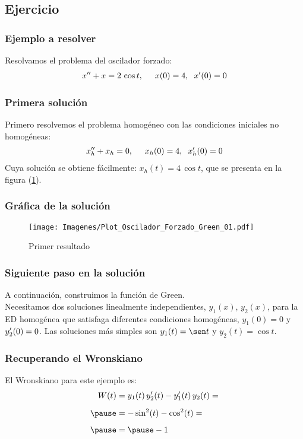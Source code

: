 \documentclass[12pt]{beamer}
\begin{document}
\subsection{Ejercicio}

\begin{frame}
\frametitle{Ejemplo a resolver}
Resolvamos el problema del oscilador forzado:
\pause
\begin{align*}
{x}^{\prime \prime} + x = 2 \, \cos t, \hspace{0.5cm} x (0) = 4, \hspace{0.2cm} {x}^{\prime} (0) = 0
\end{align*}
\end{frame}
\begin{frame}
\frametitle{Primera solución}
Primero resolvemos el problema homogéneo con las condiciones iniciales no homogéneas:
\pause
\begin{align*}
{x}^{\prime \prime}_{h} + x_{h} = 0, \hspace{0.5cm} x_{h} (0) = 4, \hspace{0.2cm} {x}^{\prime}_{h} (0) = 0
\end{align*}
\pause
Cuya solución se obtiene fácilmente: $x_{h} (t) = 4 \, \cos t$, que se presenta en la figura (\ref{fig:figura_01}).
\end{frame}
\begin{frame}
\frametitle{Gráfica de la solución}
\begin{figure}[H]
    \centering
    \texttt{[image: Imagenes/Plot\_Oscilador\_Forzado\_Green\_01.pdf]}
    \caption{Primer resultado}
    \label{fig:figura_01}
\end{figure} 
\end{frame}
\begin{frame}
\frametitle{Siguiente paso en la solución}
A continuación, construimos la función de Green.
\\
\bigskip
\pause
Necesitamos dos soluciones linealmente independientes, $y_{1} (x)$, $y_{2} (x)$, para la ED homogénea que satisfaga diferentes condiciones homogéneas, $y_{1} (0) = 0$ y ${y}^{\prime}_{2} (0) = 0$. \pause Las soluciones más simples son $y_{1} (t) = \sen t$ y $y_{2} (t) = \cos t$.
\end{frame}
\begin{frame}
\frametitle{Recuperando el Wronskiano}
El Wronskiano para este ejemplo es:
\pause
\begin{eqnarray*}
\begin{aligned}
W (t) &= y_{1} (t) \, \pderivada{y}_{2} (t) - \pderivada{y}_{1} (t) \, y_{2} (t) = \\[0.5em] \pause
&=  - \sin^{2} (t) - \cos^{2} (t) = \\[0.5em] \pause
&= \pause - 1 
\end{aligned}
\end{eqnarray*}
\end{frame}
\end{document}
